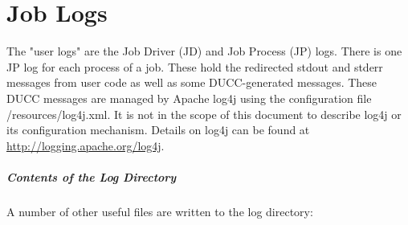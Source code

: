 % 
% 
% 
% 
\ifpdf
\else
{}
\fi
\chapter{Job Logs}
\label{chap:job-logs}

The "user logs" are the Job Driver (JD) and Job Process (JP) logs. There is one JP log for each process 
of a job.  These hold the redirected stdout and stderr messages from user code as well as some DUCC-generated
messages.  These DUCC messages are managed by Apache log4j using the configuration file 
\duccruntime/resources/log4j.xml. It is not in the scope of this document to describe log4j or its
configuration mechanism. Details on log4j can be found at \url{http://logging.apache.org/log4j}.

\paragraph{Contents of the Log Directory} A number of other useful files are written to the log directory: 

